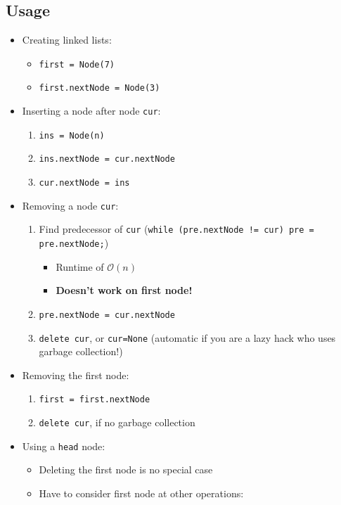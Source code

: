 \documentclass[12pt, a4paper]{scrartcl}
\newcommand{\bigO}{\mathcal{O}}
\begin{document}
\subsection{Usage}
\begin{itemize}
\item Creating linked lists:
  \begin{itemize}
  \item \texttt{first = Node(7)}
  \item \texttt{first.nextNode = Node(3)}
  \end{itemize}
\item Inserting a node after node \texttt{cur}:
  \begin{enumerate}
  \item \texttt{ins = Node(n)}
  \item \texttt{ins.nextNode = cur.nextNode}
  \item \texttt{cur.nextNode = ins}
  \end{enumerate}%
\item Removing a node \texttt{cur}:
  \begin{enumerate}
  \item Find predecessor of \texttt{cur} (\texttt{while (pre.nextNode != cur) pre = pre.nextNode;})
    \begin{itemize}
    \item Runtime of $\bigO(n)$
    \item \textbf{Doesn't work on first node!}
    \end{itemize}
  \item \texttt{pre.nextNode = cur.nextNode}
  \item \texttt{delete cur}, or \texttt{cur=None} (automatic if you are a lazy hack who uses garbage collection!)
  \end{enumerate}
\item Removing the first node:
  \begin{enumerate}
  \item \texttt{first = first.nextNode}
  \item \texttt{delete cur}, if no garbage collection
  \end{enumerate}
\item Using a \texttt{head} node:
  \begin{itemize}
  \item Deleting the first node is no special case
  \item Have to consider first node at other operations:
    \begin{itemize}

\end{itemize}
\end{itemize}
\end{itemize}
\end{document}
